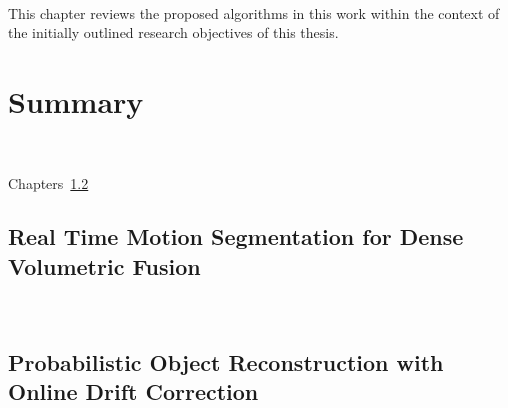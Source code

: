 ~\label{chap:discussion}
\begin{chapterabstract}
This chapter reviews the proposed algorithms in this work within the context 
of the initially outlined research objectives of this thesis.
\end{chapterabstract}

\section{Summary}
~\label{sec:discussion_summary}

Chapters~\ref{}

\subsection{Real Time Motion Segmentation for Dense Volumetric Fusion}
~\label{subsec:discussion_moseg}




\subsection{Probabilistic Object Reconstruction with Online Drift Correction}
~\label{subsec:discussion_probobj}


